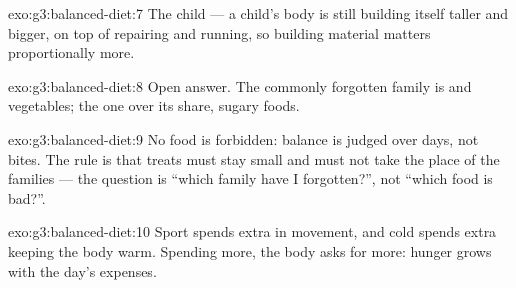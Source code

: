 \begin{solution}{exo:g3:balanced-diet:7}
The child --- a child's body is still building itself taller
and bigger, on top of repairing and running, so building
material matters proportionally more.
\end{solution}

\begin{solution}{exo:g3:balanced-diet:8}
Open answer. The commonly forgotten family is  and
vegetables; the one over its share, sugary foods.
\end{solution}

\begin{solution}{exo:g3:balanced-diet:9}
No food is forbidden: balance is judged over days, not bites.
The rule is that treats must stay small and must not take the
place of the families --- the question is ``which family have I
forgotten?'', not ``which food is bad?''.
\end{solution}

\begin{solution}{exo:g3:balanced-diet:10}
Sport spends extra  in movement, and cold spends extra
 keeping the body warm. Spending more, the body asks for
more: hunger grows with the day's expenses.
\end{solution}
